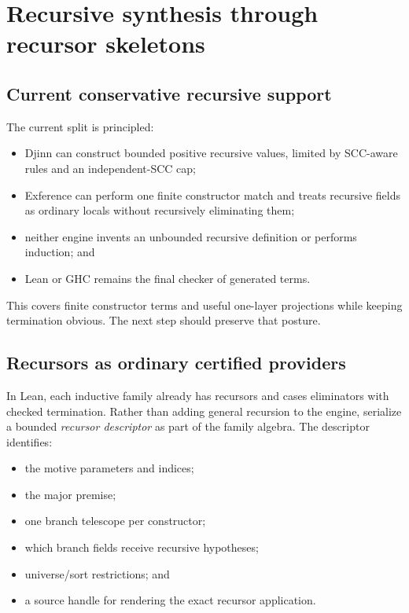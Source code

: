 \documentclass[11pt]{article}
\newcommand{\Djinn}{Djinn}
\newcommand{\Exference}{Exference}
\newcommand{\term}[1]{\emph{#1}}
\begin{document}
\section{Recursive synthesis through recursor skeletons}
\label{sec:recursion}

\subsection{Current conservative recursive support}

The current split is principled:

\begin{itemize}
  \item \Djinn{} can construct bounded positive recursive values, limited by
    SCC-aware rules and an independent-SCC cap;
  \item \Exference{} can perform one finite constructor match and treats
    recursive fields as ordinary locals without recursively eliminating them;
  \item neither engine invents an unbounded recursive definition or performs
    induction; and
  \item Lean or GHC remains the final checker of generated terms.
\end{itemize}

This covers finite constructor terms and useful one-layer projections while
keeping termination obvious.  The next step should preserve that posture.

\subsection{Recursors as ordinary certified providers}

In Lean, each inductive family already has recursors and cases eliminators with
checked termination.  Rather than adding general recursion to the engine,
serialize a bounded \term{recursor descriptor} as part of the family algebra.
The descriptor identifies:

\begin{itemize}
  \item the motive parameters and indices;
  \item the major premise;
  \item one branch telescope per constructor;
  \item which branch fields receive recursive hypotheses;
  \item universe/sort restrictions; and
  \item a source handle for rendering the exact recursor application.
\end{itemize}
\end{document}
